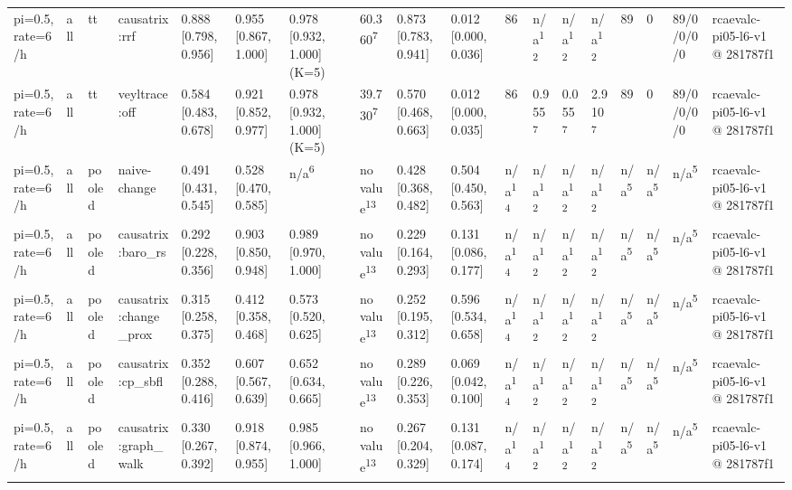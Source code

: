 \begin{table}[t]
\begin{tabular}{llllllllllllllllll}
pi=0.5, rate=6/h & all & tt & causatrix:rrf & 0.888 [0.798, 0.956] & 0.955 [0.867, 1.000] & 0.978 [0.932, 1.000] (K=5) & 60.360\textsuperscript{7} & 0.873 [0.783, 0.941] & 0.012 [0.000, 0.036] & 86 & n/a\textsuperscript{12} & n/a\textsuperscript{12} & n/a\textsuperscript{12} & 89 & 0 & 89/0/0/0/0 & rcaevalc-pi05-l6-v1 @ 281787f1 \\
pi=0.5, rate=6/h & all & tt & veyltrace:off & 0.584 [0.483, 0.678] & 0.921 [0.852, 0.977] & 0.978 [0.932, 1.000] (K=5) & 39.730\textsuperscript{7} & 0.570 [0.468, 0.663] & 0.012 [0.000, 0.035] & 86 & 0.955\textsuperscript{7} & 0.055\textsuperscript{7} & 2.910\textsuperscript{7} & 89 & 0 & 89/0/0/0/0 & rcaevalc-pi05-l6-v1 @ 281787f1 \\
pi=0.5, rate=6/h & all & pooled & naive-change & 0.491 [0.431, 0.545] & 0.528 [0.470, 0.585] & n/a\textsuperscript{6} & no value\textsuperscript{13} & 0.428 [0.368, 0.482] & 0.504 [0.450, 0.563] & n/a\textsuperscript{14} & n/a\textsuperscript{12} & n/a\textsuperscript{12} & n/a\textsuperscript{12} & n/a\textsuperscript{5} & n/a\textsuperscript{5} & n/a\textsuperscript{5} & rcaevalc-pi05-l6-v1 @ 281787f1 \\
pi=0.5, rate=6/h & all & pooled & causatrix:baro\_rs & 0.292 [0.228, 0.356] & 0.903 [0.850, 0.948] & 0.989 [0.970, 1.000] & no value\textsuperscript{13} & 0.229 [0.164, 0.293] & 0.131 [0.086, 0.177] & n/a\textsuperscript{14} & n/a\textsuperscript{12} & n/a\textsuperscript{12} & n/a\textsuperscript{12} & n/a\textsuperscript{5} & n/a\textsuperscript{5} & n/a\textsuperscript{5} & rcaevalc-pi05-l6-v1 @ 281787f1 \\
pi=0.5, rate=6/h & all & pooled & causatrix:change\_prox & 0.315 [0.258, 0.375] & 0.412 [0.358, 0.468] & 0.573 [0.520, 0.625] & no value\textsuperscript{13} & 0.252 [0.195, 0.312] & 0.596 [0.534, 0.658] & n/a\textsuperscript{14} & n/a\textsuperscript{12} & n/a\textsuperscript{12} & n/a\textsuperscript{12} & n/a\textsuperscript{5} & n/a\textsuperscript{5} & n/a\textsuperscript{5} & rcaevalc-pi05-l6-v1 @ 281787f1 \\
pi=0.5, rate=6/h & all & pooled & causatrix:cp\_sbfl & 0.352 [0.288, 0.416] & 0.607 [0.567, 0.639] & 0.652 [0.634, 0.665] & no value\textsuperscript{13} & 0.289 [0.226, 0.353] & 0.069 [0.042, 0.100] & n/a\textsuperscript{14} & n/a\textsuperscript{12} & n/a\textsuperscript{12} & n/a\textsuperscript{12} & n/a\textsuperscript{5} & n/a\textsuperscript{5} & n/a\textsuperscript{5} & rcaevalc-pi05-l6-v1 @ 281787f1 \\
pi=0.5, rate=6/h & all & pooled & causatrix:graph\_walk & 0.330 [0.267, 0.392] & 0.918 [0.874, 0.955] & 0.985 [0.966, 1.000] & no value\textsuperscript{13} & 0.267 [0.204, 0.329] & 0.131 [0.087, 0.174] & n/a\textsuperscript{14} & n/a\textsuperscript{12} & n/a\textsuperscript{12} & n/a\textsuperscript{12} & n/a\textsuperscript{5} & n/a\textsuperscript{5} & n/a\textsuperscript{5} & rcaevalc-pi05-l6-v1 @ 281787f1 \\

\end{tabular}
\end{table}
